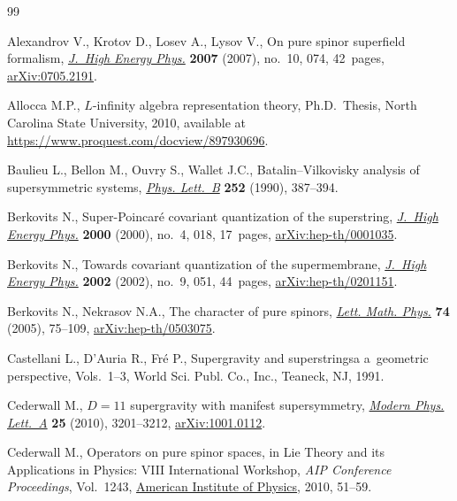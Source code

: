 \documentclass[pdftex]{sigma}
\numberwithin{equation}{section}
\begin{document}
\begin{thebibliography}{99}
\footnotesize\itemsep=0pt

Alexandrov V., Krotov D., Losev A., Lysov V., On pure spinor superfield
 formalism, \href{https://doi.org/10.1088/1126-6708/2007/10/074}{\textit{J.~High Energy Phys.}} \textbf{2007} (2007), no.~10, 074,
 42~pages, \href{https://arxiv.org/abs/0705.2191}{arXiv:0705.2191}.

Allocca M.P., $L$-infinity algebra representation theory, Ph.D.~Thesis,
 {N}orth Carolina State University, 2010, available at
 \url{https://www.proquest.com/docview/897930696}.

Baulieu L., Bellon M., Ouvry S., Wallet J.C., Batalin--{V}ilkovisky analysis of
 supersymmetric systems, \href{https://doi.org/10.1016/0370-2693(90)90557-M}{\textit{Phys. Lett.~B}} \textbf{252} (1990), 387--394.

Berkovits N., Super-{P}oincar\'e covariant quantization of the superstring,
 \href{https://doi.org/10.1088/1126-6708/2000/04/018}{\textit{J.~High Energy Phys.}} \textbf{2000} (2000), no.~4, 018, 17~pages,
 \href{https://arxiv.org/abs/hep-th/0001035}{arXiv:hep-th/0001035}.

Berkovits N., Towards covariant quantization of the supermembrane,
 \href{https://doi.org/10.1088/1126-6708/2002/09/051}{\textit{J.~High Energy Phys.}} \textbf{2002} (2002), no.~9, 051, 44~pages,
 \href{https://arxiv.org/abs/hep-th/0201151}{arXiv:hep-th/0201151}.

Berkovits N., Nekrasov N.A., The character of pure spinors, \href{https://doi.org/10.1007/s11005-005-0009-7}{\textit{Lett. Math.
 Phys.}} \textbf{74} (2005), 75--109, \href{https://arxiv.org/abs/hep-th/0503075}{arXiv:hep-th/0503075}.

Castellani L., D'Auria R., Fr\'e P., Supergravity and superstringsa a~geometric
 perspective, {V}ols.~1--3, World Sci. Publ. Co., Inc., Teaneck, NJ, 1991.

Cederwall M., {$D=11$} supergravity with manifest supersymmetry, \href{https://doi.org/10.1142/S0217732310034407}{\textit{Modern
 Phys. Lett.~A}} \textbf{25} (2010), 3201--3212, \href{https://arxiv.org/abs/1001.0112}{arXiv:1001.0112}.

Cederwall M., Operators on pure spinor spaces, in Lie Theory and its
 Applications in Physics: {VIII} International Workshop, \textit{AIP
 Conference Proceedings}, Vol.~1243, \href{https://doi.org/10.1063/1.3460180}{American Institute of Physics}, 2010,
 51--59.


\end{thebibliography}
\end{document}
